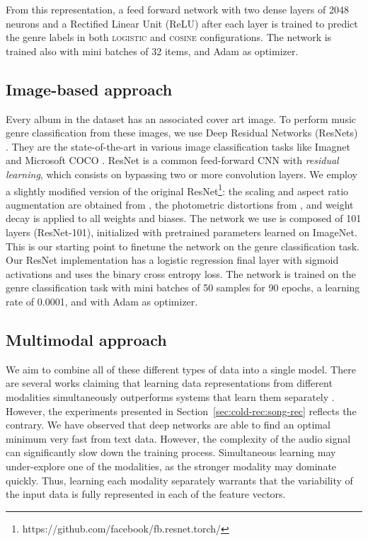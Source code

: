 From this representation, a feed forward network with two dense layers of 2048 neurons and a Rectified Linear Unit (ReLU) after each layer is trained to predict the genre labels in both \textsc{logistic} and \textsc{cosine} configurations. 
The network is trained also with mini batches of 32 items, and Adam as optimizer.

\subsection{Image-based approach}
\label{sec:multi-class:resnet}
Every album in the dataset has an associated cover art image. To perform music genre classification from these images, we use Deep Residual Networks (ResNets) \citep{he2016deep}.
They are the state-of-the-art in various image classification tasks like Imagnet \citep{ILSVRC15} and Microsoft COCO \citep{lin2014microsoft}. 
ResNet is a common feed-forward CNN with \emph{residual learning}, which consists on bypassing two or more convolution layers. %
We employ a slightly modified version of the original ResNet\footnote{https://github.com/facebook/fb.resnet.torch/}: the scaling and aspect ratio augmentation are obtained from \cite{szegedy2015going}, the photometric distortions from \cite{howard2013some}, and weight decay is applied to all weights and biases. %
The network we use is composed of 101 layers (ResNet-101), initialized with pretrained parameters learned on ImageNet.
This is our starting point to finetune the network on the genre classification task.
Our ResNet implementation has a logistic regression final layer with sigmoid activations and uses the binary cross entropy loss.
The network is trained on the genre classification task with mini batches of 50 samples for 90 epochs, a learning rate of 0.0001, and with Adam as optimizer.

\subsection{Multimodal approach}\label{sec:multi-class:multimodal}

We aim to combine all of these different types of data into a single model.
There are several works claiming that learning data representations from different modalities simultaneously outperforms systems that learn them separately \citep{ngiam2011multimodal,dorfer2016towards}. However, the experiments presented in Section~\ref{sec:cold-rec:song-rec} reflects the contrary. We have observed that deep networks are able to find an optimal minimum very fast from text data. However, the complexity of the audio signal can significantly slow down the training process. Simultaneous learning may under-explore one of the modalities, as the stronger modality may dominate quickly. Thus, learning each modality separately warrants that the variability of the input data is fully represented in each of the feature vectors.

